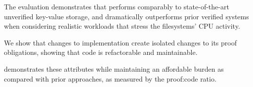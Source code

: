 The evaluation demonstrates that {\veribetrkv} performs comparably to
state-of-the-art unverified key-value storage, and dramatically outperforms
prior verified systems when considering realistic workloads that stress
the filesystems' CPU activity.

We show that changes to {\veribetrkv} implementation create isolated
changes to its proof obligations, showing that {\ironstar} code is
refactorable and maintainable.

{\veribetrkv} demonstrates these attributes while maintaining an affordable
burden as compared with prior approaches, as measured by the proof:code
ratio.

